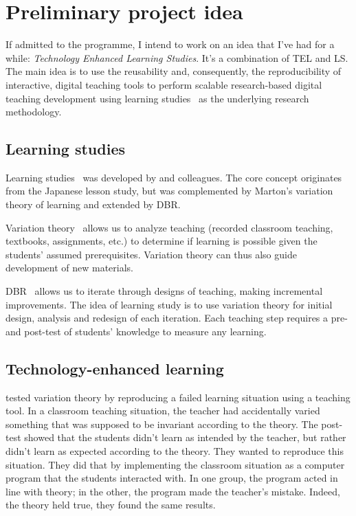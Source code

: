 \section{Preliminary project idea}


If admitted to the programme, I intend to work on an idea that I've had for a 
while: \emph{Technology Enhanced Learning Studies}.
It's a combination of {\ac{TEL}} and {\ac{LS}}.
The main idea is to use the reusability and, consequently, the reproducibility 
of interactive, digital teaching tools to perform scalable research-based 
digital teaching development using learning studies~\autocite{LearningStudy} as 
the underlying research methodology.


\subsection{Learning studies}

Learning studies~\autocite{LearningStudy} was developed by 
\citeauthor{LearningStudy} and colleagues.
The core concept originates from the Japanese lesson study, but was 
complemented by Marton's variation theory of learning and extended by \ac{DBR}.

Variation theory~\autocite{VariationTheory} allows us to analyze teaching 
(recorded classroom teaching, textbooks, assignments, etc.) to determine if 
learning is possible given the students' assumed prerequisites.
Variation theory can thus also guide development of new materials.

\Ac{DBR}~\autocite{DesignBasedResearch} allows us to iterate through designs of 
teaching, making incremental improvements.
The idea of learning study is to use variation theory for initial design, 
analysis and redesign of each iteration.
Each teaching step requires a pre- and post-test of students' knowledge to 
measure any learning.


\subsection{Technology-enhanced learning}

\Textcite{MeaningsAreAcquired} tested variation theory by reproducing a failed 
learning situation using a teaching tool.
In a classroom teaching situation, the teacher had accidentally varied 
something that was supposed to be invariant according to the theory.
The post-test showed that the students didn't learn as intended by the teacher, 
but rather didn't learn as expected according to the theory.
They wanted to reproduce this situation.
They did that by implementing the classroom situation as a computer program 
that the students interacted with.
In one group, the program acted in line with theory; in the other, the program 
made the teacher's mistake.
Indeed, the theory held true, they found the same results.

